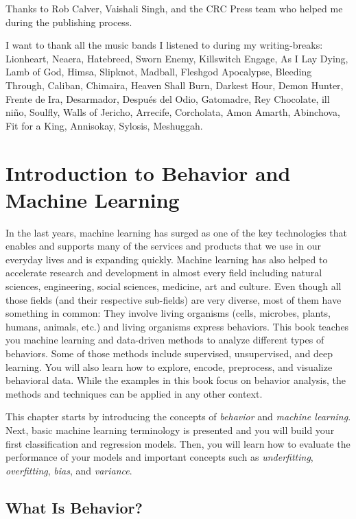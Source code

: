 \documentclass[
  11pt,
]{krantz}
\begin{document}
Thanks to Rob Calver, Vaishali Singh, and the CRC Press team who helped me during the publishing process.

I want to thank all the music bands I listened to during my writing-breaks: Lionheart, Neaera, Hatebreed, Sworn Enemy, Killswitch Engage, As I Lay Dying, Lamb of God, Himsa, Slipknot, Madball, Fleshgod Apocalypse, Bleeding Through, Caliban, Chimaira, Heaven Shall Burn, Darkest Hour, Demon Hunter, Frente de Ira, Desarmador, Después del Odio, Gatomadre, Rey Chocolate, ill niño, Soulfly, Walls of Jericho, Arrecife, Corcholata, Amon Amarth, Abinchova, Fit for a King, Annisokay, Sylosis, Meshuggah.

\mainmatter

\hypertarget{intro}{%
\chapter{Introduction to Behavior and Machine Learning}\label{intro}}

In the last years, machine learning has surged as one of the key technologies that enables and supports many of the services and products that we use in our everyday lives and is expanding quickly. Machine learning has also helped to accelerate research and development in almost every field including natural sciences, engineering, social sciences, medicine, art and culture. Even though all those fields (and their respective sub-fields) are very diverse, most of them have something in common: They involve living organisms (cells, microbes, plants, humans, animals, etc.) and living organisms express behaviors. This book teaches you machine learning and data-driven methods to analyze different types of behaviors. Some of those methods include supervised, unsupervised, and deep learning. You will also learn how to explore, encode, preprocess, and visualize behavioral data. While the examples in this book focus on behavior analysis, the methods and techniques can be applied in any other context.

This chapter starts by introducing the concepts of \emph{behavior} and \emph{machine learning}. Next, basic machine learning terminology is presented and you will build your first classification and regression models. Then, you will learn how to evaluate the performance of your models and important concepts such as \emph{underfitting}, \emph{overfitting}, \emph{bias}, and \emph{variance}.

\hypertarget{what-is-behavior}{%
\section{What Is Behavior?}\label{what-is-behavior}}
\end{document}
